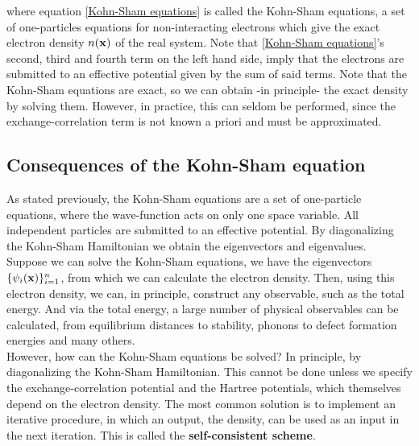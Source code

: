 \documentclass{homework}
\begin{document}
where equation \eqref{Kohn-Sham equations} is called the Kohn-Sham equations, a set of one-particles equations for non-interacting electrons which give the exact electron density $n({\bf x})$ of the real system. Note that \eqref{Kohn-Sham equations}'s second, third and fourth term on the left hand side, imply that the electrons are submitted to an effective potential given by the sum of said terms. Note that the Kohn-Sham equations are exact, so we can obtain -in principle- the exact density by solving them. However, in practice, this can seldom be performed, since the exchange-correlation term is not known a priori and must be approximated. \\

\subsection{Consequences of the Kohn-Sham equation}

As stated previously, the Kohn-Sham equations are a set of one-particle equations, where the wave-function acts on only one space variable. All independent particles are submitted to an effective potential. By diagonalizing the Kohn-Sham Hamiltonian we obtain the eigenvectors and eigenvalues. \\

Suppose we can solve the Kohn-Sham equations, we have the eigenvectors $\{\psi_{i}({\bf x})\}_{i=1}^{n}$, from which we can calculate the electron density. Then, using this electron density, we can, in principle, construct any observable, such as the total energy. And via the total energy, a large number of physical observables can be calculated, from equilibrium distances to stability, phonons to defect formation energies and many others. \\

However, how can the Kohn-Sham equations be solved? In principle, by diagonalizing the Kohn-Sham Hamiltonian. This cannot be done unless we specify the exchange-correlation potential and the Hartree potentials, which themselves depend on the electron density. The most common solution is to implement an iterative procedure, in which an output, the density, can be used as an input in the next iteration. This is called the \textbf{self-consistent scheme}. \\
\end{document}
